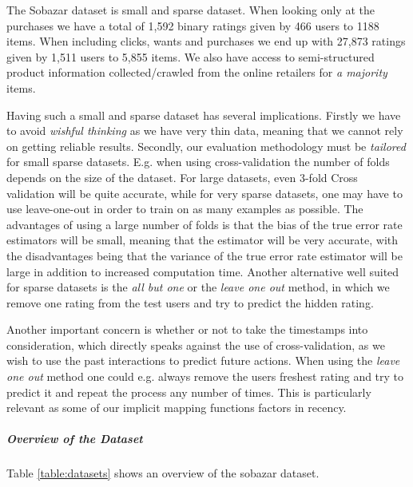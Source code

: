 The Sobazar dataset is small and sparse dataset. When looking only at the purchases
we have a total of 1,592 binary ratings given by 466 users to 1188 items. When including
clicks, wants and purchases we end up with 27,873 ratings given by 1,511 users to 5,855 items.
We also have access to semi-structured product information collected/crawled from
the online retailers for \emph{a majority} items.

Having such a small and sparse dataset has several implications. Firstly we have
to avoid \emph{wishful thinking} as we have very thin data, meaning that we cannot
rely on getting reliable results. Secondly, our evaluation methodology must be
\emph{tailored} for small sparse datasets. E.g. when using cross-validation the number
of folds depends on the size of the dataset. For large datasets, even 3-fold Cross
validation will be quite accurate, while for very sparse datasets, one may have to
use leave-one-out in order to train on as many examples as possible. The advantages
of using a large number of folds is that the bias of the true error rate estimators
will be small, meaning that the estimator will be very accurate, with the disadvantages being that
the variance of the true error rate estimator will be large in addition to increased
computation time. Another alternative well suited for sparse datasets is the \emph{all but one} or the
\emph{leave one out} method, in which we remove one rating from the test users
and try to predict the hidden rating.

Another important concern is whether or not to take the timestamps into consideration,
which directly speaks against the use of cross-validation, as we wish to use the past
interactions to predict future actions. When using the \emph{leave one out} method one
could e.g. always remove the users freshest rating and try to predict it and repeat the
process any number of times. This is particularly relevant as some of our implicit mapping functions
factors in recency.

\subparagraph{Overview of the Dataset}

Table \ref{table:datasets} shows an overview of the sobazar dataset.


